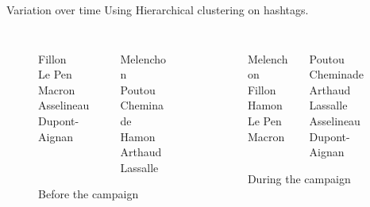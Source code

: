 \documentclass{beamer}
\begin{document}
\begin{frame}{Variation over time}
Using Hierarchical clustering on hashtags.
\bigskip

\begin{columns}
\begin{column}{.4\textwidth}
\center 
\begin{figure}
\begin{columns}
\begin{column}{.5\textwidth}
\center
Fillon\\
Le Pen\\
Macron\\
Asselineau\\
Dupont-Aignan
\end{column}


\begin{column}{.5\textwidth}
\center 
Melenchon\\
Poutou\\
Cheminade\\
Hamon\\
Arthaud\\
Lassalle\\
\end{column}
\end{columns}
\caption{Before the campaign}
\end{figure}
\end{column}


\vline

\begin{column}{.5\textwidth}
\center
\begin{figure}
\begin{columns}
\begin{column}{.5\textwidth}
\center
Melenchon\\
Fillon\\
Hamon\\
Le Pen\\
Macron
\end{column}

\begin{column}{.5\textwidth}
\center
Poutou\\
Cheminade\\
Arthaud\\
Lassalle\\
Asselineau\\
Dupont-Aignan
\end{column}
\end{columns}
\caption{During the campaign}
\end{figure}
\end{column}
\end{columns}


\end{frame}
\end{document}
